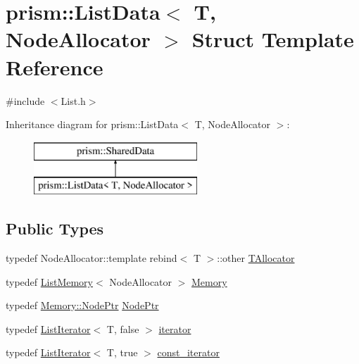 \hypertarget{structprism_1_1_list_data}{}\section{prism\+:\+:List\+Data$<$ T, Node\+Allocator $>$ Struct Template Reference}
\label{structprism_1_1_list_data}


{\ttfamily \#include $<$List.\+h$>$}

Inheritance diagram for prism\+:\+:List\+Data$<$ T, Node\+Allocator $>$\+:\begin{figure}[H]
\begin{center}
\leavevmode
\includegraphics[height=2.000000cm]{structprism_1_1_list_data}
\end{center}
\end{figure}
\subsection*{Public Types}
\begin{DoxyCompactItemize}
\item 
typedef Node\+Allocator\+::template rebind$<$ T $>$\+::other \hyperlink{structprism_1_1_list_data_a597c6b4d1df951d5c23e7e11a365f05e}{T\+Allocator}
\item 
typedef \hyperlink{structprism_1_1_list_memory}{List\+Memory}$<$ Node\+Allocator $>$ \hyperlink{structprism_1_1_list_data_a6d98e28cb4bb0df40d244e1a9ee372a2}{Memory}
\item 
typedef \hyperlink{structprism_1_1_list_memory_a9e7b9eaaf60c96090da1d52221a944f1}{Memory\+::\+Node\+Ptr} \hyperlink{structprism_1_1_list_data_a6abedadad0342afa083fed664b90d474}{Node\+Ptr}
\item 
typedef \hyperlink{structprism_1_1_list_iterator}{List\+Iterator}$<$ T, false $>$ \hyperlink{structprism_1_1_list_data_a4bc53f6312c92f848fe93b2814904cff}{iterator}
\item 
typedef \hyperlink{structprism_1_1_list_iterator}{List\+Iterator}$<$ T, true $>$ \hyperlink{structprism_1_1_list_data_adf50481f89392e64eb3de1fbffd20c63}{const\+\_\+iterator}
\end{DoxyCompactItemize}

